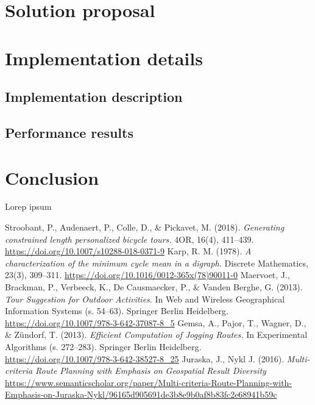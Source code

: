 \documentclass{ctuthesis}
\begin{document}
\chapter{Solution proposal}

\chapter{Implementation details}

\section{Implementation description}

\section{Performance results}

\chapter{Conclusion}
Lorep ipsum \cite{stroobant}
\begin{thebibliography}{1}
Stroobant, P., Audenaert, P., Colle, D., \& Pickavet, M. (2018). \emph{Generating constrained length personalized bicycle tours.} 4OR, 16(4), 411–439. \url{https://doi.org/10.1007/s10288-018-0371-9} 
Karp, R. M. (1978). \emph{A characterization of the minimum cycle mean in a digraph.} Discrete Mathematics, 23(3), 309–311. \url{https://doi.org/10.1016/0012-365x(78)90011-0} 
Maervoet, J., Brackman, P., Verbeeck, K., De Causmaecker, P., \& Vanden Berghe, G. (2013). \emph{Tour Suggestion for Outdoor Activities}. In Web and Wireless Geographical Information Systems (s. 54–63). Springer Berlin Heidelberg. \url{https://doi.org/10.1007/978-3-642-37087-8_5} 
Gemsa, A., Pajor, T., Wagner, D., \& Zündorf, T. (2013). \emph{Efficient Computation of Jogging Routes.} In Experimental Algorithms (s. 272–283). Springer Berlin Heidelberg. \url{https://doi.org/10.1007/978-3-642-38527-8_25} 
 Juraska, J., Nykl J. (2016). \emph{Multi-criteria Route Planning with Emphasis on Geospatial Result Diversity} \url{https://www.semanticscholar.org/paper/Multi-criteria-Route-Planning-with-Emphasis-on-Juraska-Nykl/96165d905691de3b8e9b0af8b83fc2e68941b59c}
\end{thebibliography}
\end{document}
